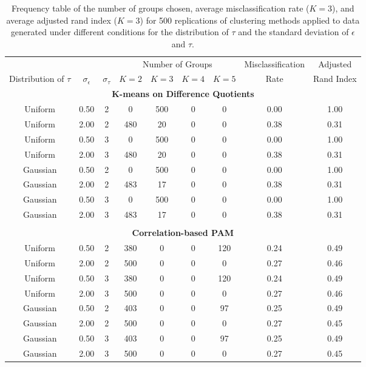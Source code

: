 \begin{table}[ht]
\begin{center}
\begin{tabular}{ccc|cccccc}
  \hline &&&\multicolumn{4}{c}{Number of Groups}&Misclassification&Adjusted\\ Distribution of $\tau$&$\sigma_{\epsilon}$&$\sigma_{\tau}$&$K=2$&$K=3$&$K=4$&$K=5$&Rate&Rand Index\\ \hline\multicolumn{9}{c}{\textbf{K-means on Difference Quotients}}\\ Uniform & 0.50 &   2 &   0 & 500 &   0 &   0 & 0.00 & 1.00 \\ 
  Uniform & 2.00 &   2 & 480 &  20 &   0 &   0 & 0.38 & 0.31 \\ 
  Uniform & 0.50 &   3 &   0 & 500 &   0 &   0 & 0.00 & 1.00 \\ 
  Uniform & 2.00 &   3 & 480 &  20 &   0 &   0 & 0.38 & 0.31 \\ 
  Gaussian & 0.50 &   2 &   0 & 500 &   0 &   0 & 0.00 & 1.00 \\ 
  Gaussian & 2.00 &   2 & 483 &  17 &   0 &   0 & 0.38 & 0.31 \\ 
  Gaussian & 0.50 &   3 &   0 & 500 &   0 &   0 & 0.00 & 1.00 \\ 
  Gaussian & 2.00 &   3 & 483 &  17 &   0 &   0 & 0.38 & 0.31 \\ 
   \\ \multicolumn{9}{c}{\textbf{Correlation-based PAM}}\\Uniform & 0.50 &   2 & 380 &   0 &   0 & 120 & 0.24 & 0.49 \\ 
  Uniform & 2.00 &   2 & 500 &   0 &   0 &   0 & 0.27 & 0.46 \\ 
  Uniform & 0.50 &   3 & 380 &   0 &   0 & 120 & 0.24 & 0.49 \\ 
  Uniform & 2.00 &   3 & 500 &   0 &   0 &   0 & 0.27 & 0.46 \\ 
  Gaussian & 0.50 &   2 & 403 &   0 &   0 &  97 & 0.25 & 0.49 \\ 
  Gaussian & 2.00 &   2 & 500 &   0 &   0 &   0 & 0.27 & 0.45 \\ 
  Gaussian & 0.50 &   3 & 403 &   0 &   0 &  97 & 0.25 & 0.49 \\ 
  Gaussian & 2.00 &   3 & 500 &   0 &   0 &   0 & 0.27 & 0.45 \\ 
   \hline\end{tabular}
\caption{Frequency table of the number of groups chosen, average misclassification rate ($K=3$), and average adjusted rand index ($K=3$) for 500 replications of clustering methods applied to data generated under different conditions for the distribution of $\tau$ and the standard deviation of $\epsilon$ and $\tau$.}
\label{tab:freq2}
\end{center}
\end{table}

